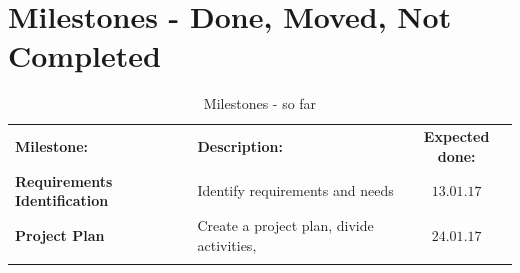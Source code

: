 \begin{table}[h]

\centering\section*{\textbf{Milestones - Done, Moved, Not Completed}}
\caption{Milestones - so far}
\begin{tabular}{llc}
\rowcolor{cadetgrey}
\centering \textbf{Milestone:}    &\textbf{Description:} 	 &\textbf{Expected done:} \\ %

\rowcolor{green}
\textbf{Requirements Identification} & Identify requirements and needs & $13.01.17$ 
\\\rowcolor{green}
\textbf{Project Plan} & Create a project plan, divide activities, & $24.01.17$ \\\rowcolor{green}


\end{tabular}
\end{table}
